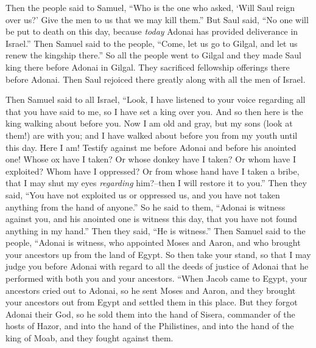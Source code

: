 \begin{biblechapter}
\verse Then the people said to Samuel, “Who is the one who asked, ‘Will Saul reign over us?’ Give the men to us that we may kill them.”
\verse But Saul said, “No one will be put to death on this day, because \textit{today} Adonai has provided deliverance in Israel.”
\verse Then Samuel said to the people, “Come, let us go to Gilgal, and let us renew the kingship there.”
\verse So all the people went to Gilgal and they made Saul king there before Adonai in Gilgal. They sacrificed fellowship offerings there before Adonai. Then Saul rejoiced there greatly along with all the men of Israel.
\end{biblechapter}

\begin{biblechapter} %
 Then Samuel said to all Israel, “Look, I have listened to your voice regarding all that you have said to me, so I have set a king over you.
\verse And so then here is the king walking about before you. Now I am old and gray, but my sons (look at them!) are with you; and I have walked about before you from my youth until this day.
\verse Here I am! Testify against me before Adonai and before his anointed one! Whose ox have I taken? Or whose donkey have I taken? Or whom have I exploited? Whom have I oppressed? Or from whose hand have I taken a bribe, that I may shut my eyes \textit{regarding} him?–then I will restore it to you.”
\verse Then they said, “You have not exploited us or oppressed us, and you have not taken anything from the hand of anyone.”
\verse So he said to them, “Adonai is witness against you, and his anointed one is witness this day, that you have not found anything in my hand.” Then they said, “He is witness.”
\verse Then Samuel said to the people, “Adonai is witness, who appointed Moses and Aaron, and who brought your ancestors up from the land of Egypt.
\verse So then take your stand, so that I may judge you before Adonai with regard to all the deeds of justice of Adonai that he performed with both you and your ancestors.
\verse “When Jacob came to Egypt, your ancestors cried out to Adonai, so he sent Moses and Aaron, and they brought your ancestors out from Egypt and settled them in this place.
\verse But they forgot Adonai their God, so he sold them into the hand of Sisera, commander of the hosts of Hazor, and into the hand of the Philistines, and into the hand of the king of Moab, and they fought against them.

\end{biblechapter}
